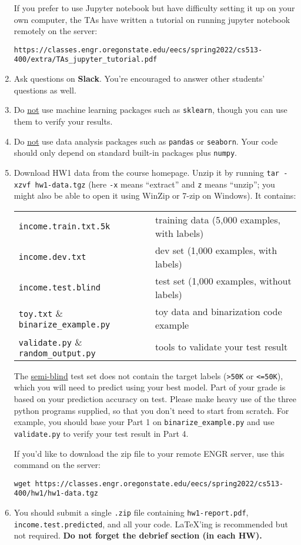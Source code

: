 \documentclass[11pt]{article}
\newcommand{\update}[1]{{\bf\color{black} #1}}
\begin{document}
\begin{enumerate}
If you prefer to use Jupyter notebook but have difficulty setting it up on your own computer, 
the TAs have written a tutorial on running jupyter notebook remotely on the server:

\verb|https://classes.engr.oregonstate.edu/eecs/spring2022/cs513-400/extra/TAs_jupyter_tutorial.pdf|

\item Ask questions on \update{Slack}. You're encouraged to answer other students' questions as well.

\item Do \underline{not} use machine learning packages such as {\tt sklearn}, though you can use them to verify your results.
\item Do \underline{not} use data analysis packages such as {\tt pandas} or {\tt seaborn}.
Your code should only depend on standard built-in packages plus {\tt numpy}.

\item Download  HW1 data from the course homepage. Unzip it by running \verb|tar -xzvf hw1-data.tgz| (here \verb|-x| means ``extract'' and \verb|z| means ``unzip''; you might also be able to open it using WinZip or 7-zip on Windows).
It contains:

\begin{tabular}{ll}
\verb|income.train.txt.5k| & training data (5,000 examples, with labels)\\
\verb|income.dev.txt| & dev set (1,000 examples, with labels)\\
\verb|income.test.blind| & test set (1,000 examples, without labels)\\
\verb|toy.txt| \& \verb|binarize_example.py| & toy data and binarization code example\\
\verb|validate.py| \& \verb|random_output.py| & tools to validate your test result
\end{tabular}

The \underline{semi-blind} test set does not contain the target labels (\verb|>50K| or \verb|<=50K|), which you will need to predict using your best model.
Part of your grade is based on your prediction accuracy on test.
Please make heavy use of the three python programs supplied, so that you don't need to start from scratch. For example, you should base your Part 1 on \verb|binarize_example.py| and use \verb|validate.py| to verify your test result in Part 4.

If you'd like to download the zip file to your remote ENGR server, use this command on the server:

\verb|wget https://classes.engr.oregonstate.edu/eecs/spring2022/cs513-400/hw1/hw1-data.tgz|


\item You should submit a single {\tt .zip} file containing {\tt hw1-report.pdf}, {\tt income.test.predicted}, and all your code.
  \LaTeX'ing is recommended but not required.
  {\bf Do not forget the debrief section (in each HW).}
\end{enumerate}
\end{document}
